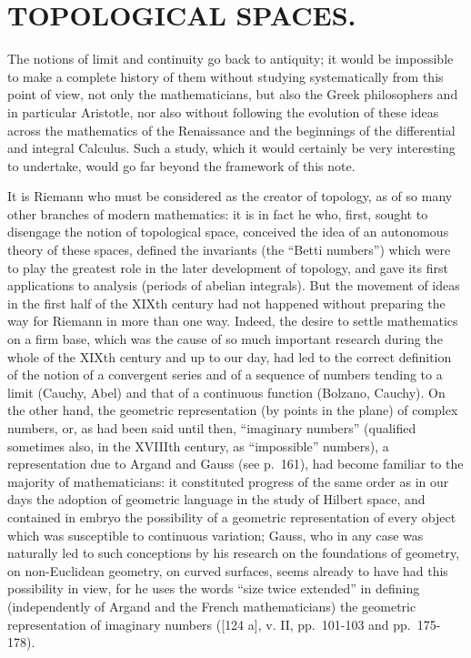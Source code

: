 \chapter{TOPOLOGICAL SPACES.}

The notions of limit and continuity go back to antiquity; it would be impossible to make a complete history of them without studying systematically from this point of view, not only the mathematicians, but also the Greek philosophers and in particular Aristotle, nor also without following the evolution of these ideas across the mathematics of the Renaissance and the beginnings of the differential and integral Calculus. Such a study, which it would certainly be very interesting to undertake, would go far beyond the framework of this note.

It is Riemann who must be considered as the creator of topology, as of so many other branches of modern mathematics: it is in fact he who, first, sought to disengage the notion of topological space, conceived the idea of an autonomous theory of these spaces, defined the invariants (the ``Betti numbers'') which were to play the greatest role in the later development of topology, and gave its first applications to analysis (periods of abelian integrals). But the movement of ideas in the first half of the XIXth century had not happened without preparing the way for Riemann in more than one way. Indeed, the desire to settle mathematics on a firm base, which was the cause of so much important research during the whole of the XIXth century and up to our day, had led to the correct definition of the notion of a convergent series and of a sequence of numbers tending to a limit (Cauchy, Abel) and that of a continuous function (Bolzano, Cauchy). On the other hand, the geometric representation (by points in the plane) of complex numbers, or, as had been said until then, ``imaginary numbers'' (qualified sometimes also, in the XVIIIth century, as ``impossible'' numbers), a representation due to Argand and Gauss (see p.~161), had become familiar to the majority of mathematicians: it constituted progress of the same order as in our days the adoption of geometric language in the study of Hilbert space, and contained in embryo the possibility of a geometric representation of every object which was susceptible to continuous variation; Gauss, who in any case was naturally led to such conceptions by his research on the foundations of geometry, on non-Euclidean geometry, on curved surfaces, seems already to have had this possibility in view, for he uses the words ``size twice extended'' in defining (independently of Argand and the French mathematicians) the geometric representation of imaginary numbers ({[}124 a{]}, v. II, pp.~101-103 and pp.~175-178).

